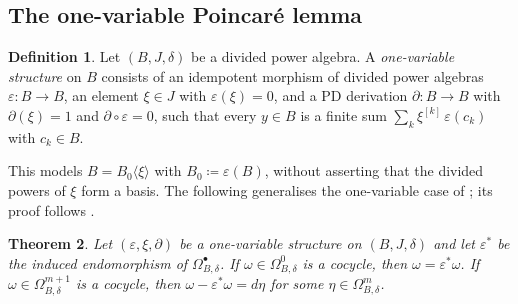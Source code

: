 \documentclass[11pt]{amsart}
\newcommand{\dpow}[1]{^{[#1]}}
\theoremstyle{plain}
\newtheorem{theorem}{Theorem}[section]
\theoremstyle{definition}
\newtheorem{definition}[theorem]{Definition}
\theoremstyle{remark}
\begin{document}
\subsection{The one-variable Poincaré lemma}

\begin{definition}
Let $(B, J, \delta)$ be a divided power algebra. A \emph{one-variable structure} on $B$ consists of an idempotent morphism of divided power algebras $\varepsilon \colon B \to B$, an element $\xi \in J$ with $\varepsilon(\xi) = 0$, and a PD derivation $\partial \colon B \to B$ with $\partial(\xi) = 1$ and $\partial \circ \varepsilon = 0$, such that every $y \in B$ is a finite sum $\sum_k \xi\dpow{k}\, \varepsilon(c_k)$ with $c_k \in B$.
\end{definition}

This models $B = B_0\langle \xi \rangle$ with $B_0 \coloneqq \varepsilon(B)$, without asserting that the divided powers of $\xi$ form a basis. The following generalises the one-variable case of \cite[Tag~07LD]{stacks}; its proof follows \cite[Tags~07Q7, 07Q8]{stacks}.

\begin{theorem}\label{thm:one-variable}
Let $(\varepsilon, \xi, \partial)$ be a one-variable structure on $(B, J, \delta)$ and let $\varepsilon^*$ be the induced endomorphism of $\Omega^\bullet_{B,\delta}$. If $\omega \in \Omega^0_{B,\delta}$ is a cocycle, then $\omega = \varepsilon^*\omega$. If $\omega \in \Omega^{m+1}_{B,\delta}$ is a cocycle, then $\omega - \varepsilon^*\omega = d\eta$ for some $\eta \in \Omega^m_{B,\delta}$.
\end{theorem}
\end{document}
